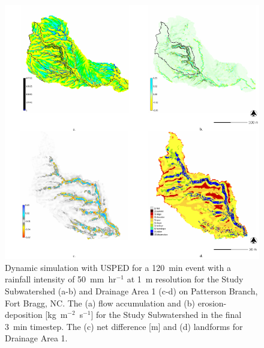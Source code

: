\documentclass[gmd, manuscript]{copernicus}
\begin{document}
\begin{figure}
\center
\includegraphics[width=\textwidth,height=0.925\textheight,keepaspectratio]{figures/usped.pdf}
\caption{Dynamic simulation with USPED
for a 120~\unit{min} event 
with a rainfall intensity of 50~\unit{mm~hr}$^{-1}$
at 1~\unit{m} resolution for
the Study Subwatershed (a-b)
and Drainage Area 1 (c-d)
on Patterson Branch, Fort Bragg, NC.
The (a) flow accumulation and
(b) erosion-deposition [\unit{kg~m}$^{-2}$~\unit{s}$^{-1}$]
for the Study Subwatershed in the final 3~\unit{min} timestep.
The (c) net difference [\unit{m}] and (d) landforms 
for Drainage Area 1.
}
\label{fig:usped_simulation}
\end{figure}
\end{document}

